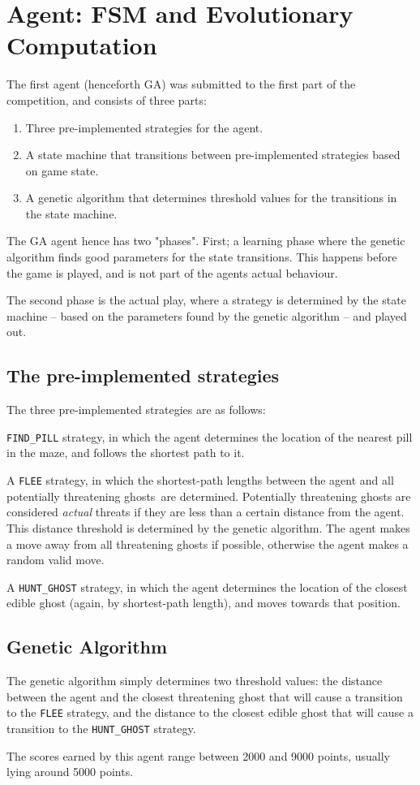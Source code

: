 \section{Agent: FSM and Evolutionary Computation}
\label{sec:GA}

The first agent (henceforth GA) was submitted to the first part of the competition, and consists of three parts:

\begin{enumerate}
\item Three pre-implemented strategies for the agent.
\item A state machine that transitions between pre-implemented strategies based
	on game state.
\item A genetic algorithm that determines threshold values for the transitions
	in the state machine.
\end{enumerate}

The GA agent hence has two "phases". First; a learning phase where the genetic
algorithm finds good parameters for the state transitions. This happens before
the game is played, and is not part of the agents actual behaviour.

The second phase is the actual play, where a strategy is determined by the state
machine -- based on the parameters found by the genetic algorithm -- and played out.
\subsection{The pre-implemented strategies}
The three pre-implemented strategies are as follows:

 \texttt{FIND\_PILL} strategy, in which the agent determines the location of the
nearest pill in the maze, and follows the shortest path to it.

A \texttt{FLEE} strategy, in which the shortest-path lengths between the agent
and all potentially threatening ghosts\footnotemark\ are determined.
Potentially threatening ghosts are considered \textit{actual} threats if they
are less than a certain distance from the agent. This distance threshold is
determined by the genetic algorithm. The agent makes a move away from all
threatening ghosts if possible, otherwise the agent makes a random valid move.

A \texttt{HUNT\_GHOST} strategy, in which the agent determines the location of
the closest edible ghost (again, by shortest-path length), and moves towards
that position.

\subsection{Genetic Algorithm}
The genetic algorithm simply determines two threshold values: the distance
between the agent and the closest threatening ghost that will cause a transition
to the \texttt{FLEE} strategy, and the distance to the closest edible ghost that
will cause a transition to the \texttt{HUNT\_GHOST} strategy.

The scores earned by this agent range between 2000 and 9000 points, usually
lying around 5000 points.


